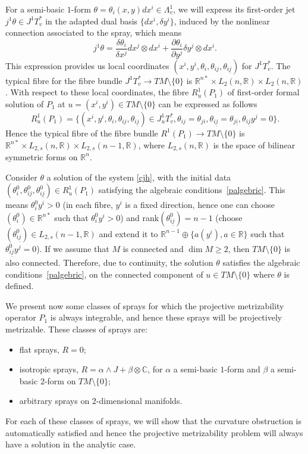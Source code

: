 \documentclass[pdftex]{sigma}
\numberwithin{equation}{section}
\begin{document}
For a semi-basic $1$-form $\theta=\theta_i(x, y)dx^i \in \Lambda^1_v$,
we will express its f\/irst-order jet $j^1\theta\in J^1T^*_v$ in the
adapted dual basis $\{dx^i, \delta y^i\}$, induced by the nonlinear
connection associated to the spray, which means
\[
j^1\theta=\frac{\delta \theta_i}{\delta x^j} dx^j\otimes dx^i +
\frac{\partial \theta_i}{\partial y^j}\delta y^j\otimes dx^i.
\] This
expression provides us local coordinates $(x^i, y^i, \theta_i,
\theta_{ij}, \theta_{i\underline{j}})$ for $J^1T^*_v$. The typical
f\/ibre for the f\/ibre bundle $J^1T^*_v \to TM\setminus\{0\}$ is
$\mathbb{R}^{n*}\times L_2(n,\mathbb{R}) \times
L_2(n,\mathbb{R})$. With respect to these local coordinates, the f\/ibre
$R_u^1(P_1)$ of f\/irst-order formal solution of $P_1$ at $u=(x^i,y^i)\in
TM\setminus\{0\}$ can be expressed as follows
\[
 R^1_u(P_1)=\{(x^i, y^i, \theta_i,
\theta_{ij}, \theta_{i\underline{j}}) \in J^1_uT^*_v,
\theta_{ij}=\theta_{ji}, \theta_{i\underline{j}}=
\theta_{j\underline{i}}, \theta_{i\underline{j}}y^j=0\}.
\] Hence the
typical f\/ibre of the f\/ibre bundle $R^1(P_1) \to TM\setminus\{0\}$ is
$\mathbb{R}^{n*}\times L_{2, s}(n,\mathbb{R}) \times
L_{2,s}(n-1,\mathbb{R})$, where $L_{2,s}(n,\mathbb{R})$ is the space
of bilinear symmetric forms on $\mathbb{R}^n$.

Consider $\theta$ a solution of the system \eqref{cjh}, with the initial
data $(\theta^0_i, \theta^0_{ij}, \theta^0_{i\underline{j}})\in R^1_u(P_1)$ satisfying
the algebraic conditions~\eqref{palgebric}. This means $\theta^0_iy^i>0$
(in each f\/ibre, $y^i$ is a f\/ixed direction, hence one can choose
$(\theta^0_i)\in \mathbb{R}^{n*}$ such that $\theta^0_iy^i>0$) and
rank$(\theta^0_{i\underline{j}})=n-1$ (choose
$(\theta^0_{i\underline{j}})\in L_{2,s}(n-1, \mathbb{R})$ and extend
it to $\mathbb{R}^{n-1}\oplus \{a(y^i), a\in \mathbb{R}\}$ such that
$\theta^0_{i\underline{j}}y^j=0$).  If we assume that $M$ is
connected and $\dim M\geq 2$, then $TM\setminus\{0\}$ is also connected.
Therefore, due to continuity, the solution $\theta$ satisf\/ies the algebraic
conditions~\eqref{palgebric}, on the connected component of $u\in TM\setminus\{0\}$ where
$\theta$ is def\/ined.

We present now some classes of sprays for which the projective
metrizability operator $P_1$ is always integrable, and hence these
sprays will be projectively metrizable. These classes of sprays are:
\begin{itemize}\itemsep=0pt
\item[i)] f\/lat sprays, $R=0$;
\item[ii)] isotropic sprays, $R=\alpha\wedge J+\beta\otimes \mathbb{C}$, for $\alpha$ a
semi-basic $1$-form and $\beta$ a semi-basic $2$-form on $TM\setminus\{0\}$;
\item[iii)] arbitrary sprays on $2$-dimensional manifolds.
\end{itemize}
For each of these classes of sprays, we will show that the curvature obstruction
is automatically satisf\/ied and hence the projective metrizability
problem will always have a solution in the analytic case.
\end{document}
